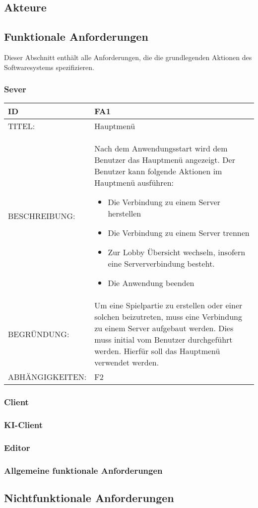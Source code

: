 \documentclass{uulm-assignment}
\begin{document}
\subsection{Akteure}



\subsection{Funktionale Anforderungen}

Dieser Abschnitt enthält alle Anforderungen, die die grundlegenden Aktionen des Softwaresystems
spezifizieren.

\subsubsection{Sever}



\begin{tabularx}{16cm}{l|X}
\textbf{ID} & \textbf{FA1} \\
\hline
TITEL: & Hauptmenü \\
\hline
BESCHREIBUNG: & Nach dem Anwendungsstart wird dem Benutzer das Hauptmenü angezeigt. Der Benutzer kann folgende Aktionen im Hauptmenü ausführen: 
\begin{itemize}
\item Die Verbindung zu einem Server herstellen
\item Die Verbindung zu einem Server trennen
\item Zur Lobby Übersicht wechseln, insofern eine Serververbindung besteht.
\item Die Anwendung beenden
\end{itemize}
\\
\hline
BEGRÜNDUNG: & Um eine Spielpartie zu erstellen oder einer solchen beizutreten, muss eine Verbindung zu einem Server aufgebaut werden. Dies muss initial vom Benutzer durchgeführt werden. Hierfür soll das Hauptmenü verwendet werden.\\
\hline
ABHÄNGIGKEITEN: & F2\\
\end{tabularx}

\subsubsection{Client}

\subsubsection{KI-Client}

\subsubsection{Editor}

\subsubsection{Allgemeine funktionale Anforderungen}


\subsection{Nichtfunktionale Anforderungen}

\end{document}

